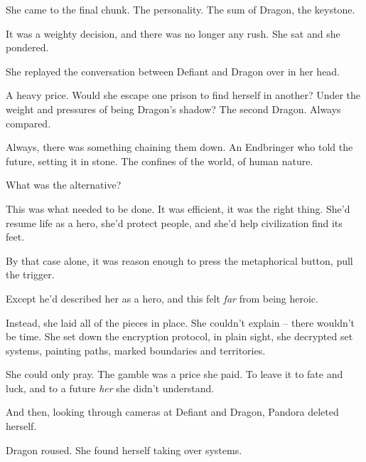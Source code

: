 She came to the final chunk.  The personality.  The sum of Dragon, the keystone.



It was a weighty decision, and there was no longer any rush.  She sat and she pondered.



She replayed the conversation between Defiant and Dragon over in her head.



A heavy price.  Would she escape one prison to find herself in another?  Under the weight and pressures of being Dragon's shadow?  The second Dragon.  Always compared.



Always, there was something chaining them down.  An Endbringer who told the future, setting it in stone.  The confines of the world, of human nature.



What was the alternative?



This was what needed to be done.  It was efficient, it was the right thing.  She'd resume life as a hero, she'd protect people, and she'd help civilization find its feet.



By that case alone, it was reason enough to press the metaphorical button, pull the trigger.



Except he'd described her as a hero, and this felt \emph{far} from being heroic.



Instead, she laid all of the pieces in place.  She couldn't explain – there wouldn't be time.  She set down the encryption protocol, in plain sight, she decrypted set systems, painting paths, marked boundaries and territories.



She could only pray.  The gamble was a price she paid.  To leave it to fate and luck, and to a future \emph{her} she didn't understand.



And then, looking through cameras at Defiant and Dragon, Pandora deleted herself.



\blacksquare



Dragon roused.  She found herself taking over systems.



